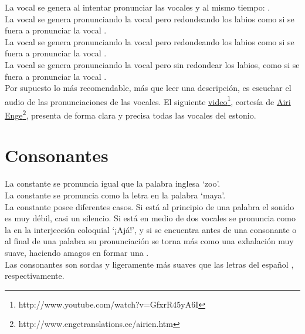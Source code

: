 \begin{enumerate}
	La vocal  se genera al intentar pronunciar las vocales  y  al mismo tiempo: \bemph{\ae}.\\

	La vocal  se genera pronunciando la vocal  pero redondeando los labios como si se fuera a pronunciar la vocal .\\

	La vocal  se genera pronunciando la vocal  pero redondeando los labios como si se fuera a pronunciar la vocal .\\

	La vocal  se genera pronunciando la vocal  pero sin redondear los labios, como si se fuera a pronunciar la vocal .\\

	Por supuesto lo más recomendable, más que leer una descripción, es escuchar el audio de las pronunciaciones de las vocales. El siguiente \href{http://www.youtube.com/watch?v=GfxrR45yA6I}{video}\footnote{http://www.youtube.com/watch?v=GfxrR45yA6I}, cortesía de \href{http://www.engetranslations.ee/airien.htm}{Airi Enge}\footnote{http://www.engetranslations.ee/airien.htm}, presenta de forma clara y precisa todas las vocales del estonio.\\

 	\section*{\Large{Consonantes}}

 	La constante  se pronuncia igual que la palabra inglesa `zoo'.\\

 	La constante  se pronuncia como la letra  en la palabra `maya'.\\

 	La constante  posee diferentes casos. Si está al principio de una palabra el sonido es muy débil, casi un silencio. Si está en medio de dos vocales se pronuncia como la  en la interjección coloquial `¡Ajá!', y si se encuentra antes de una consonante o al final de una palabra su pronunciación se torna más como una exhalación muy suave, haciendo amagos en formar una .\\

 	Las consonantes  son sordas y ligeramente más suaves que las letras del español , respectivamente.\\


\end{enumerate}
